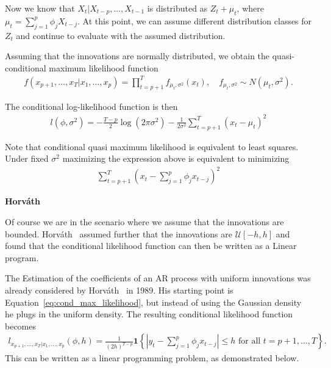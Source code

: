 Now we know that $X_t|X_{t-p},\dots,X_{t-1}$ is distributed as $Z_t+\mu_t$, where $\mu_t=\sum_{j=1}^{p}\phi_jX_{t-j}$. At this point, we can assume different distribution classes for $Z_t$ and continue to evaluate with the assumed distribution.

Assuming that the innovations are normally distributed, we obtain the quasi-conditional maximum likelihood function
\begin{align*}
    f(x_{p+1},\dots,x_T|x_1,\dots,x_p)=\prod_{t=p+1}^{T}f_{\mu_t,\sigma^2}(x_t),\quad f_{\mu_t,\sigma^2}\sim N(\mu_t,\sigma^2).
\end{align*}

The conditional log-likelihood function is then
\begin{align*}
    l(\phi,\sigma^2)=-\frac{T-p}{2}\log{(2\pi\sigma^2)}-\frac{1}{2\sigma^2}\sum_{t=p+1}^{T}(x_t-\mu_t)^2
\end{align*}

Note that conditional quasi maximum likelihood is equivalent to least squares. Under fixed $\sigma^2$ maximizing the expression above is equivalent to minimizing
\begin{align*}
    \sum_{t=p+1}^{T}\left(x_t-\sum_{j=1}^{p}\phi_jx_{t-j}\right)^2
\end{align*}

\textbf{Horváth}

Of course we are in the scenario where we assume that the innovations are bounded. Horváth~\cite{horvath_ar_1989} assumed further that the innovations are $\mathcal{U}[-h,h]$ and found that the conditional likelihood function can then be written as a Linear program.

The Estimation of the coefficients of an AR process with uniform innovations was already considered by Horváth~\cite{horvath_ar_1989} in 1989. His starting point is Equation~\eqref{eq:cond_max_likelihood}, but instead of using the Gaussian density he plugs in the uniform density. The resulting conditional likelihood function becomes
\begin{align}\label{eq:cond_max_likelihood_uniform}
    l_{x_{p+1},\dots,x_T|x_1,\dots,x_p}(\phi,h)=\frac{1}{(2h)^{T-p}}\mathbf{1}\left\{\left|y_t-\sum_{j=1}^{p}\phi_jx_{t-j}\right|\le h\text{ for all }t=p+1,\dots,T\right\}.
\end{align}
This can be written as a linear programming problem, as demonstrated below.

